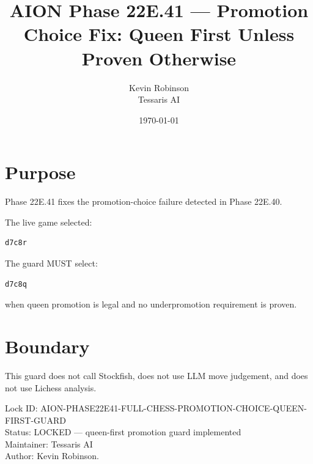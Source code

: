 \documentclass[11pt,a4paper]{article}
\title{\textbf{AION Phase 22E.41 --- Promotion Choice Fix: Queen First Unless Proven Otherwise}}
\author{Kevin Robinson\\Tessaris AI}
\date{\today}
\begin{document}
\maketitle

\section{Purpose}

Phase 22E.41 fixes the promotion-choice failure detected in Phase 22E.40.

The live game selected:

\begin{verbatim}
d7c8r
\end{verbatim}

The guard MUST select:

\begin{verbatim}
d7c8q
\end{verbatim}

when queen promotion is legal and no underpromotion requirement is proven.

\section{Boundary}

This guard does not call Stockfish, does not use LLM move judgement, and does not use Lichess analysis.

\bigskip

\noindent
Lock ID: AION-PHASE22E41-FULL-CHESS-PROMOTION-CHOICE-QUEEN-FIRST-GUARD\\
Status: LOCKED --- queen-first promotion guard implemented\\
Maintainer: Tessaris AI\\
Author: Kevin Robinson.
\end{document}

